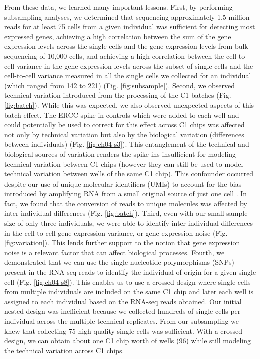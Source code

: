 From these data, we learned many important lessons. First, by
performing subsampling analyses, we determined that sequencing
approximately 1.5 million reads for at least 75 cells from a given
individual was sufficient for detecting most expressed genes,
achieving a high correlation between the sum of the gene expression
levels across the single cells and the gene expression levels from
bulk sequencing of 10,000 cells, and achieving a high correlation
between the cell-to-cell variance in the gene expression levels across
the subset of single cells and the cell-to-cell variance measured in
all the single cells we collected for an individual (which ranged from
142 to 221) (Fig. \ref{fig:subsample}). Second, we observed technical
variation introduced from the processing of the C1 batches
(Fig. \ref{fig:batch}). While this was expected, we also observed
unexpected aspects of this batch effect. The ERCC spike-in controls
which were added to each well and could potentially be used to correct
for this effect across C1 chips was affected not only by technical
variation but also by the biological variation (differences between
individuals) (Fig. \ref{fig:ch04-s3}). This entanglement of the
technical and biological sources of variation renders the spike-ins
insufficient for modeling technical variation between C1 chips
(however they can still be used to model technical variation between
wells of the same C1 chip). This confounder occurred despite our use
of unique molecular identifiers (UMIs) to account for the bias
introduced by amplifying RNA from a small original source of just one
cell \citep{Kivioja2011, Islam2014}. In fact, we found that the
conversion of reads to unique molecules was affected by
inter-individual differences (Fig. \ref{fig:batch}). Third, even with
our small sample size of only three individuals, we were able to
identify inter-individual differences in the cell-to-cell gene
expression variance, or gene expression noise
(Fig. \ref{fig:variation}). This lends further support to the notion
that gene expression noise is a relevant factor that can affect
biological processes. Fourth, we demonstrated that we can use the
single nucleotide polymorphisms (SNPs) present in the RNA-seq reads to
identify the individual of origin for a given single cell
\citep{Jun2012} (Fig. \ref{fig:ch04-s8}). This enables us to use a
crossed-design where single cells from multiple individuals are
included on the same C1 chip and later each well is assigned to each
individual based on the RNA-seq reads obtained. Our initial nested
design was inefficient because we collected hundreds of single cells
per individual across the multiple technical replicates. From our
subsampling we knew that collecting 75 high quality single cells was
sufficient. With a crossed design, we can obtain about one C1 chip
worth of wells (96) while still modeling the technical variation
across C1 chips.

